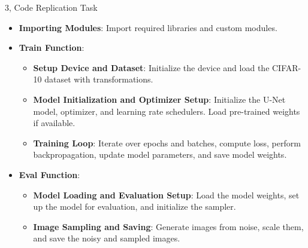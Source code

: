 \documentclass[10pt,a4paper]{article}
\begin{document}
\begin{task}{3, Code Replication Task}
\begin{itemize}
    \item \textbf{Importing Modules}: Import required libraries and custom modules.
    \item \textbf{Train Function}:
        \begin{itemize}
            \item \textbf{Setup Device and Dataset}: Initialize the device and load the CIFAR-10 dataset with transformations.
            \item \textbf{Model Initialization and Optimizer Setup}: Initialize the U-Net model, optimizer, and learning rate schedulers. Load pre-trained weights if available.
            \item \textbf{Training Loop}: Iterate over epochs and batches, compute loss, perform backpropagation, update model parameters, and save model weights.
        \end{itemize}
    \item \textbf{Eval Function}:
        \begin{itemize}
            \item \textbf{Model Loading and Evaluation Setup}: Load the model weights, set up the model for evaluation, and initialize the sampler.
            \item \textbf{Image Sampling and Saving}: Generate images from noise, scale them, and save the noisy and sampled images.
        \end{itemize}
\end{itemize}
\end{task}
\end{document}

